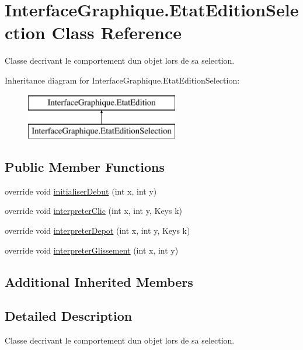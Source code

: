 \hypertarget{class_interface_graphique_1_1_etat_edition_selection}{}\section{Interface\+Graphique.\+Etat\+Edition\+Selection Class Reference}
\label{class_interface_graphique_1_1_etat_edition_selection}


Classe decrivant le comportement d\textquotesingle{}un objet lors de sa selection.  


Inheritance diagram for Interface\+Graphique.\+Etat\+Edition\+Selection\+:\begin{figure}[H]
\begin{center}
\leavevmode
\includegraphics[height=2.000000cm]{class_interface_graphique_1_1_etat_edition_selection}
\end{center}
\end{figure}
\subsection*{Public Member Functions}
\begin{DoxyCompactItemize}
\item 
override void \hyperlink{group__inf2990_ga8a2180a8469534f3e433b38171a01997}{initialiser\+Debut} (int x, int y)
\item 
override void \hyperlink{group__inf2990_gad79f5a52db7e3a5c284e14757e123959}{interpreter\+Clic} (int x, int y, Keys k)
\item 
override void \hyperlink{group__inf2990_gaf541d3e99c5c6aa6ba426b5c4837a2e1}{interpreter\+Depot} (int x, int y, Keys k)
\item 
override void \hyperlink{group__inf2990_ga7c967ae93f9be63db88d8a4396376b2a}{interpreter\+Glissement} (int x, int y)
\end{DoxyCompactItemize}
\subsection*{Additional Inherited Members}


\subsection{Detailed Description}
Classe decrivant le comportement d\textquotesingle{}un objet lors de sa selection. 


